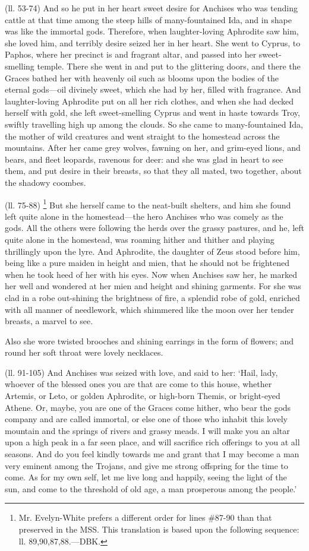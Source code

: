 (ll. 53-74) And so he put in her heart sweet desire for Anchises who was
tending cattle at that time among the steep hills of many-fountained Ida, and
in shape was like the immortal gods. Therefore, when laughter-loving Aphrodite
saw him, she loved him, and terribly desire seized her in her heart. She went
to Cyprus, to Paphos, where her precinct is and fragrant altar, and passed into
her sweet-smelling temple. There she went in and put to the glittering doors,
and there the Graces bathed her with heavenly oil such as blooms upon the
bodies of the eternal gods—oil divinely sweet, which she had by her,
filled with fragrance. And laughter-loving Aphrodite put on all her rich
clothes, and when she had decked herself with gold, she left sweet-smelling
Cyprus and went in haste towards Troy, swiftly travelling high up among the
clouds. So she came to many-fountained Ida, the mother of wild creatures and
went straight to the homestead across the mountains. After her came grey
wolves, fawning on her, and grim-eyed lions, and bears, and fleet leopards,
ravenous for deer: and she was glad in heart to see them, and put desire in
their breasts, so that they all mated, two together, about the shadowy coombes.

(ll. 75-88) \footnote{Mr. Evelyn-White prefers a
different order for lines \#87-90 than that preserved in the MSS. This
translation is based upon the following sequence: ll. 89,90,87,88.—DBK.} But she herself came to the
neat-built shelters, and him she found left quite alone in the
homestead—the hero Anchises who was comely as the gods. All the others
were following the herds over the grassy pastures, and he, left quite alone in
the homestead, was roaming hither and thither and playing thrillingly upon the
lyre. And Aphrodite, the daughter of Zeus stood before him, being like a pure
maiden in height and mien, that he should not be frightened when he took heed
of her with his eyes. Now when Anchises saw her, he marked her well and
wondered at her mien and height and shining garments. For she was clad in a
robe out-shining the brightness of fire, a splendid robe of gold, enriched with
all manner of needlework, which shimmered like the moon over her tender
breasts, a marvel to see.

Also she wore twisted brooches and shining earrings in the form of flowers; and
round her soft throat were lovely necklaces.

(ll. 91-105) And Anchises was seized with love, and said to her: ‘Hail,
lady, whoever of the blessed ones you are that are come to this house, whether
Artemis, or Leto, or golden Aphrodite, or high-born Themis, or bright-eyed
Athene. Or, maybe, you are one of the Graces come hither, who bear the gods
company and are called immortal, or else one of those who inhabit this lovely
mountain and the springs of rivers and grassy meads. I will make you an altar
upon a high peak in a far seen place, and will sacrifice rich offerings to you
at all seasons. And do you feel kindly towards me and grant that I may become a
man very eminent among the Trojans, and give me strong offspring for the time
to come. As for my own self, let me live long and happily, seeing the light of
the sun, and come to the threshold of old age, a man prosperous among the
people.’

